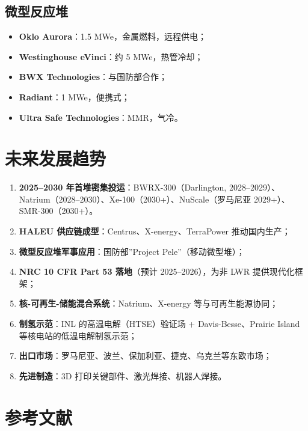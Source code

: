 \documentclass[
  UTF8,
  scheme=plain,
  fontsize=10pt,
  openany
]{ctexbook}
\begin{document}
\subsection{微型反应堆}\label{ux5faeux578bux53cdux5e94ux5806}

\begin{itemize}
\tightlist
\item
  \textbf{Oklo Aurora}：1.5 MWe，金属燃料，远程供电；
\item
  \textbf{Westinghouse eVinci}：约 5 MWe，热管冷却；
\item
  \textbf{BWX Technologies}：与国防部合作；
\item
  \textbf{Radiant}：1 MWe，便携式；
\item
  \textbf{Ultra Safe Technologies}：MMR，气冷。
\end{itemize}

\section{未来发展趋势}\label{ux672aux6765ux53d1ux5c55ux8d8bux52bf-2}

\begin{enumerate}
\def\labelenumi{\arabic{enumi}.}
\tightlist
\item
  \textbf{2025--2030 年首堆密集投运}：BWRX-300（Darlington,
  2028--2029）、Natrium（2028--2030）、Xe-100（2030+）、NuScale（罗马尼亚
  2029+）、SMR-300（2030+）。
\item
  \textbf{HALEU 供应链成型}：Centrus、X-energy、TerraPower
  推动国内生产；
\item
  \textbf{微型反应堆军事应用}：国防部''Project Pele''（移动微型堆）；
\item
  \textbf{NRC 10 CFR Part 53 落地}（预计 2025--2026），为非 LWR
  提供现代化框架；
\item
  \textbf{核-可再生-储能混合系统}：Natrium、X-energy
  等与可再生能源协同；
\item
  \textbf{制氢示范}：INL 的高温电解（HTSE）验证场 + Davis-Besse、Prairie
  Island 等核电站的低温电解制氢示范；
\item
  \textbf{出口市场}：罗马尼亚、波兰、保加利亚、捷克、乌克兰等东欧市场；
\item
  \textbf{先进制造}：3D 打印关键部件、激光焊接、机器人焊接。
\end{enumerate}

\section{参考文献}\label{ux53c2ux8003ux6587ux732e-11}
\end{document}
